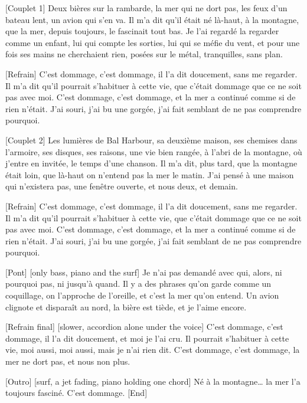 \begin{lyrics}

[Couplet 1]
Deux bières sur la rambarde, la mer qui ne dort pas,
les feux d'un bateau lent, un avion qui s'en va.
Il m'a dit qu'il était né là-haut, à la montagne,
que la mer, depuis toujours, le fascinait tout bas.
Je l'ai regardé la regarder comme un enfant,
lui qui compte les sorties, lui qui se méfie du vent,
et pour une fois ses mains ne cherchaient rien,
posées sur le métal, tranquilles, sans plan.

[Refrain]
C'est dommage, c'est dommage,
il l'a dit doucement, sans me regarder.
Il m'a dit qu'il pourrait s'habituer à cette vie,
que c'était dommage que ce ne soit pas avec moi.
C'est dommage, c'est dommage,
et la mer a continué comme si de rien n'était.
J'ai souri, j'ai bu une gorgée,
j'ai fait semblant de ne pas comprendre pourquoi.

[Couplet 2]
Les lumières de Bal Harbour, sa deuxième maison,
ses chemises dans l'armoire, ses disques, ses raisons,
une vie bien rangée, à l'abri de la montagne,
où j'entre en invitée, le temps d'une chanson.
Il m'a dit, plus tard, que la montagne était loin,
que là-haut on n'entend pas la mer le matin.
J'ai pensé à une maison qui n'existera pas,
une fenêtre ouverte, et nous deux, et demain.

[Refrain]
C'est dommage, c'est dommage,
il l'a dit doucement, sans me regarder.
Il m'a dit qu'il pourrait s'habituer à cette vie,
que c'était dommage que ce ne soit pas avec moi.
C'est dommage, c'est dommage,
et la mer a continué comme si de rien n'était.
J'ai souri, j'ai bu une gorgée,
j'ai fait semblant de ne pas comprendre pourquoi.

[Pont]
[only bass, piano and the surf]
Je n'ai pas demandé avec qui, alors,
ni pourquoi pas, ni jusqu'à quand.
Il y a des phrases qu'on garde comme un coquillage,
on l'approche de l'oreille, et c'est la mer qu'on entend.
Un avion clignote et disparaît au nord,
la bière est tiède, et je l'aime encore.

[Refrain final]
[slower, accordion alone under the voice]
C'est dommage, c'est dommage,
il l'a dit doucement, et moi je l'ai cru.
Il pourrait s'habituer à cette vie,
moi aussi, moi aussi, mais je n'ai rien dit.
C'est dommage, c'est dommage,
la mer ne dort pas, et nous non plus.

[Outro]
[surf, a jet fading, piano holding one chord]
Né à la montagne…
la mer l'a toujours fasciné.
C'est dommage.
[End]
\end{lyrics}

